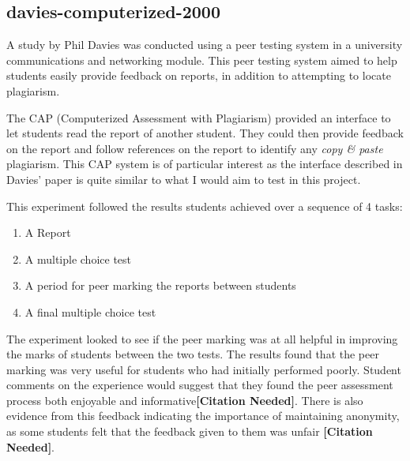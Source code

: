 \documentclass[a4paper,11pt]{report}
\newcommand{\cn}{\textbf{[Citation Needed]}}
\begin{document}
\subsection{davies-computerized-2000}
A study by Phil Davies\cite{davies_computerized_2000} was conducted using a peer testing system in a university communications and networking module. This peer testing system aimed to help students easily provide feedback on reports, in addition to attempting to locate plagiarism.\par
The CAP (Computerized Assessment with Plagiarism) provided an interface to let students read the report of another student. They could then provide feedback on the report and follow references on the report to identify any \textit{copy \& paste} plagiarism. This CAP system is of particular interest as the interface described in Davies' paper is quite similar to what I would aim to test in this project.\par
This experiment followed the results students achieved over a sequence of 4 tasks:
\begin{enumerate}
\item A Report
\item A multiple choice test
\item A period for peer marking the reports between students
\item A final multiple choice test
\end{enumerate}
The experiment looked to see if the peer marking was at all helpful in improving the marks of students between the two tests. The results found that the peer marking was very useful for students who had initially performed poorly. Student comments on the experience would suggest that they found the peer assessment process both enjoyable and informative\cn. There is also evidence from this feedback indicating the importance of maintaining anonymity, as some students felt that the feedback given to them was unfair \cn.
\end{document}
